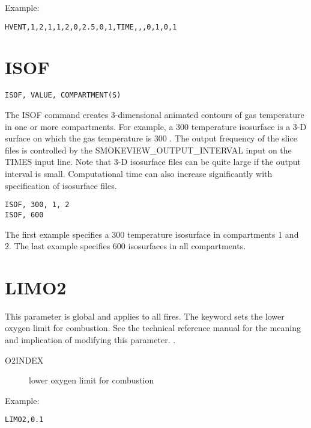 \noindent Example:

\begin{lstlisting}
HVENT,1,2,1,1,2,0,2.5,0,1,TIME,,,0,1,0,1
\end{lstlisting}

\section{ISOF}

\begin{lstlisting}
ISOF, VALUE, COMPARTMENT(S)
\end{lstlisting}

The ISOF command creates 3-dimensional animated contours of gas temperature in one or more compartments.  For example, a 300 \degc temperature isosurface is a 3-D surface on which the gas temperature is 300 \degc. The output frequency of the slice files is controlled by the SMOKEVIEW\_OUTPUT\_INTERVAL input on the TIMES input line. Note that 3-D isosurface files can be quite large if the output interval is small. Computational time can also increase significantly with specification of isosurface files.

\begin{lstlisting}
ISOF, 300, 1, 2
ISOF, 600
\end{lstlisting}

The first example specifies a 300 \degc temperature isosurface in compartments 1 and 2.  The last example specifies 600 \degc isosurfaces in all compartments.

\section{LIMO2}

This parameter is global and applies to all fires. The keyword sets the lower oxygen limit for combustion. See the technical reference manual for the meaning and implication of modifying this parameter. \cite{CFAST_Tech_Guide_7}.

\begin{adjustwidth}{1cm}{0cm}
\begin{description}
  \item[O2INDEX] lower oxygen limit for combustion
\end{description}
\end{adjustwidth}

\noindent Example:

\begin{lstlisting}
LIMO2,0.1
\end{lstlisting}

